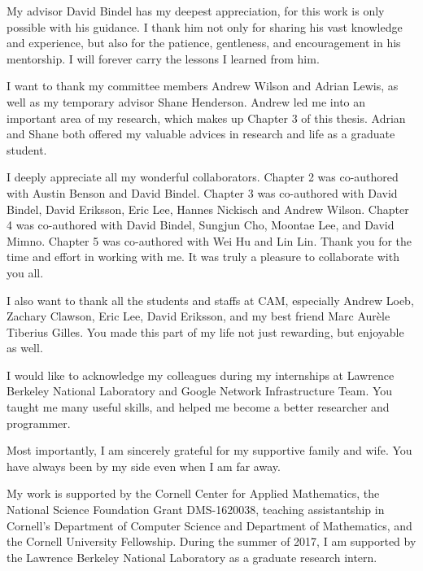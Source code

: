 My advisor David Bindel has my deepest appreciation, for this work is only
possible with his guidance. I thank him not only for sharing his vast knowledge
and experience, but also for the patience, gentleness, and encouragement in his
mentorship. I will forever carry the lessons I learned from him.

I want to thank my committee members Andrew Wilson and Adrian Lewis, as well as
my temporary advisor Shane Henderson. Andrew led me into an important area of my
research, which makes up Chapter 3 of this thesis. Adrian and Shane both offered
my valuable advices in research and life as a graduate student.

I deeply appreciate all my wonderful collaborators. Chapter 2 was co-authored
with Austin Benson and David Bindel. Chapter 3 was co-authored with David
Bindel, David Eriksson, Eric Lee, Hannes Nickisch and Andrew Wilson. Chapter 4
was co-authored with David Bindel, Sungjun Cho, Moontae Lee, and David Mimno.
Chapter 5 was co-authored with Wei Hu and Lin Lin. Thank you for the time and
effort in working with me. It was truly a pleasure to collaborate with you all.

I also want to thank all the students and staffs at CAM, especially  Andrew
Loeb, Zachary Clawson, Eric Lee, David Eriksson, and my best friend Marc Aur\`
{e}le Tiberius Gilles. You made this part of my life not just rewarding, but
enjoyable as well.

I would like to acknowledge my colleagues during my internships at Lawrence
Berkeley National Laboratory and Google Network Infrastructure Team. You
taught me many useful skills, and helped me become a better researcher and
programmer.

Most importantly, I am sincerely grateful for my supportive family and wife. You
have always been by my side even when I am far away.

My work is supported by the Cornell Center for Applied Mathematics, the National
Science Foundation Grant DMS-1620038, teaching assistantship in Cornell's
Department of Computer Science and Department of Mathematics, and the Cornell
University Fellowship. During the summer of 2017, I am supported by the Lawrence
Berkeley National Laboratory as a graduate research intern.